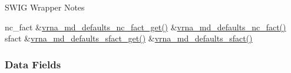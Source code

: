 \begin{DoxyRefDesc}{S\+W\+I\+G Wrapper Notes}
\begin{longtabu}
nc\+\_\+fact  &\mbox{\hyperlink{group__model__details_ga7ac759eaa7159bf5f022745f5da59508}{vrna\+\_\+md\+\_\+defaults\+\_\+nc\+\_\+fact\+\_\+get()}}  &\mbox{\hyperlink{group__model__details_gac35e596c850dce3ad55c49119fd7d471}{vrna\+\_\+md\+\_\+defaults\+\_\+nc\+\_\+fact()}}   \\
sfact  &\mbox{\hyperlink{group__model__details_gab2df6aab954b63fd3592d18e90285dae}{vrna\+\_\+md\+\_\+defaults\+\_\+sfact\+\_\+get()}}  &\mbox{\hyperlink{group__model__details_ga3f73d3029d3d0025d4cc311510cd95a3}{vrna\+\_\+md\+\_\+defaults\+\_\+sfact()}}   \\
\end{longtabu}


\end{DoxyRefDesc}
\subsubsection*{Data Fields}
